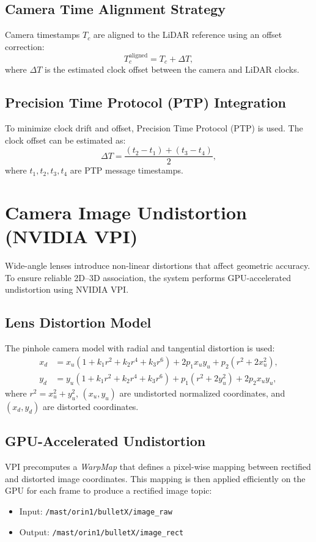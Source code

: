 \documentclass[12pt,a4paper]{report}
\begin{document}
\subsection{Camera Time Alignment Strategy}
Camera timestamps $T_c$ are aligned to the LiDAR reference using an offset correction:
\begin{equation}
T_c^{\mathrm{aligned}} = T_c + \Delta T,
\end{equation}
where $\Delta T$ is the estimated clock offset between the camera and LiDAR clocks.

\subsection{Precision Time Protocol (PTP) Integration}
To minimize clock drift and offset, Precision Time Protocol (PTP) is used. The clock offset can be estimated as:
\begin{equation}
\Delta T = \frac{(t_2 - t_1) + (t_3 - t_4)}{2},
\end{equation}
where $t_1,t_2,t_3,t_4$ are PTP message timestamps.

\section{Camera Image Undistortion (NVIDIA VPI)}
Wide-angle lenses introduce non-linear distortions that affect geometric accuracy. To ensure reliable 2D--3D association, the system performs GPU-accelerated undistortion using NVIDIA VPI.

\subsection{Lens Distortion Model}
The pinhole camera model with radial and tangential distortion is used:
\begin{equation}
\begin{aligned}
x_d &= x_u (1 + k_1 r^2 + k_2 r^4 + k_3 r^6) + 2p_1 x_u y_u + p_2(r^2 + 2x_u^2), \\
y_d &= y_u (1 + k_1 r^2 + k_2 r^4 + k_3 r^6) + p_1(r^2 + 2y_u^2) + 2p_2 x_u y_u,
\end{aligned}
\end{equation}
where $r^2 = x_u^2 + y_u^2$, $(x_u,y_u)$ are undistorted normalized coordinates, and $(x_d,y_d)$ are distorted coordinates.

\subsection{GPU-Accelerated Undistortion}
VPI precomputes a \emph{WarpMap} that defines a pixel-wise mapping between rectified and distorted image coordinates. This mapping is then applied efficiently on the GPU for each frame to produce a rectified image topic:
\begin{itemize}
    \item Input: \texttt{/mast/orin1/bulletX/image\_raw}
    \item Output: \texttt{/mast/orin1/bulletX/image\_rect}
\end{itemize}
\end{document}
